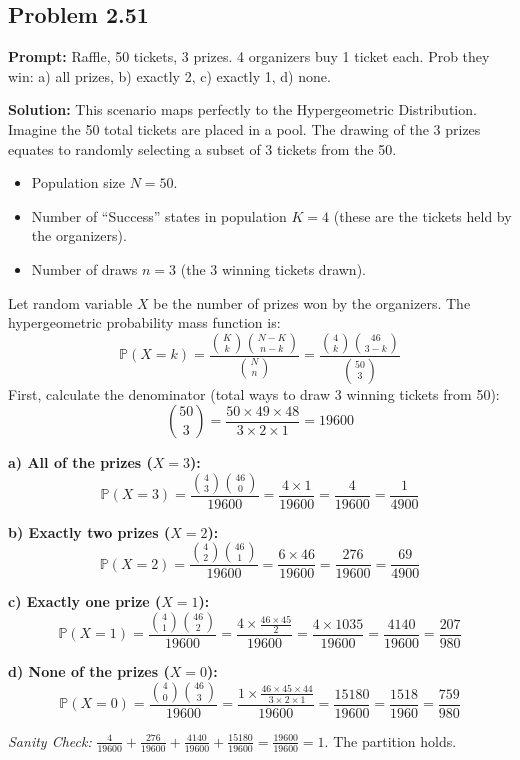\documentclass[11pt, letterpaper]{article}
\theoremstyle{definition}
\theoremstyle{remark}
\newcommand{\Prob}{\mathbb{P}}
\begin{document}
\subsection*{Problem 2.51}
\textbf{Prompt:} Raffle, 50 tickets, 3 prizes. 4 organizers buy 1 ticket each. Prob they win: a) all prizes, b) exactly 2, c) exactly 1, d) none.

\textbf{Solution:}
This scenario maps perfectly to the Hypergeometric Distribution. Imagine the 50 total tickets are placed in a pool. The drawing of the 3 prizes equates to randomly selecting a subset of 3 tickets from the 50. 
\begin{itemize}
    \item Population size $N = 50$.
    \item Number of ``Success'' states in population $K = 4$ (these are the tickets held by the organizers).
    \item Number of draws $n = 3$ (the 3 winning tickets drawn).
\end{itemize}
Let random variable $X$ be the number of prizes won by the organizers.
The hypergeometric probability mass function is:
\[ \Prob(X = k) = \frac{\binom{K}{k}\binom{N-K}{n-k}}{\binom{N}{n}} = \frac{\binom{4}{k}\binom{46}{3-k}}{\binom{50}{3}} \]
First, calculate the denominator (total ways to draw 3 winning tickets from 50):
\[ \binom{50}{3} = \frac{50 \times 49 \times 48}{3 \times 2 \times 1} = 19600 \]

\textbf{a) All of the prizes ($X = 3$):}
\[ \Prob(X = 3) = \frac{\binom{4}{3}\binom{46}{0}}{19600} = \frac{4 \times 1}{19600} = \frac{4}{19600} = \frac{1}{4900} \]

\textbf{b) Exactly two prizes ($X = 2$):}
\[ \Prob(X = 2) = \frac{\binom{4}{2}\binom{46}{1}}{19600} = \frac{6 \times 46}{19600} = \frac{276}{19600} = \frac{69}{4900} \]

\textbf{c) Exactly one prize ($X = 1$):}
\[ \Prob(X = 1) = \frac{\binom{4}{1}\binom{46}{2}}{19600} = \frac{4 \times \frac{46 \times 45}{2}}{19600} = \frac{4 \times 1035}{19600} = \frac{4140}{19600} = \frac{207}{980} \]

\textbf{d) None of the prizes ($X = 0$):}
\[ \Prob(X = 0) = \frac{\binom{4}{0}\binom{46}{3}}{19600} = \frac{1 \times \frac{46 \times 45 \times 44}{3 \times 2 \times 1}}{19600} = \frac{15180}{19600} = \frac{1518}{1960} = \frac{759}{980} \]

\textit{Sanity Check:} $\frac{4}{19600} + \frac{276}{19600} + \frac{4140}{19600} + \frac{15180}{19600} = \frac{19600}{19600} = 1$. The partition holds.
\end{document}
